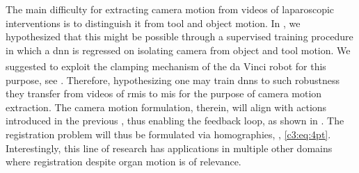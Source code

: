 The main difficulty for extracting camera motion from videos of laparoscopic interventions is to distinguish it from tool and object motion. In , we hypothesized that this might be possible through a supervised training procedure in which a \gls{dnn} is regressed on isolating camera from object and tool motion. We suggested to exploit the clamping mechanism of the da Vinci\textsuperscript{\textregistered} robot for this purpose, see . Therefore, hypothesizing one may train \gls{dnn}s to such robustness they transfer from videos of \gls{rmis} to \gls{mis} for the purpose of camera motion extraction. The camera motion formulation, therein, will align with actions introduced in the previous , thus enabling the feedback loop, as shown in . The registration problem will thus be formulated via homographies, , \eqref{c3:eq:4pt}. Interestingly, this line of research has applications in multiple other domains where registration despite organ motion is of relevance.


